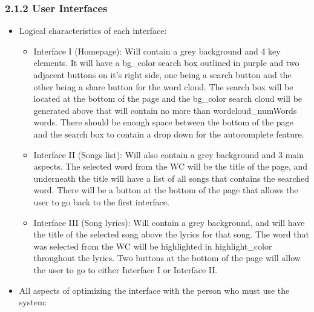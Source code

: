 \documentclass[]{article}
\begin{document}
\subsubsection{2.1.2 User Interfaces}\label{user-interfaces}

\begin{itemize}
\itemsep1pt\parskip0pt
\item
  Logical characteristics of each interface:

  \begin{itemize}
  \itemsep1pt\parskip0pt
  \item
    Interface I (Homepage): Will contain a grey background and 4 key
    elements. It will have a bg\_color search box outlined in purple and
    two adjacent buttons on it's right side, one being a search button
    and the other being a share button for the word cloud. The search
    box will be located at the bottom of the page and the bg\_color
    search cloud will be generated above that will contain no more than
    wordcloud\_numWords words. There should be enough space between the
    bottom of the page and the search box to contain a drop down for the
    autocomplete feature.
  \item
    Interface II (Songs list): Will also contain a grey background and 3
    main aspects. The selected word from the WC will be the title of the
    page, and underneath the title will have a list of all songs that
    contains the searched word. There will be a button at the bottom of
    the page that allows the user to go back to the first interface.
  \item
    Interface III (Song lyrics): Will contain a grey background, and
    will have the title of the selected song above the lyrics for that
    song. The word that was selected from the WC will be highlighted in
    highlight\_color throughout the lyrics. Two buttons at the bottom of
    the page will allow the user to go to either Interface I or
    Interface II.
  \end{itemize}
\item
  All aspects of optimizing the interface with the person who must use
  the system:


\end{itemize}
\end{document}
